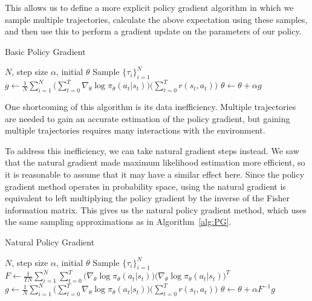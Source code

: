 \documentclass[twoside,10pt]{article}
\begin{document}
This allows us to define a more explicit policy gradient algorithm in which we sample multiple trajectories, calculate the above expectation using these samples, and then use this to perform a gradient update on the parameters of our policy.

{\centering
\begin{minipage}{0.7\linewidth}
\begin{algorithm}[H]
    \caption{Basic Policy Gradient}
    \label{alg:PG}
    \begin{algorithmic}
        \Require $N$, step size $\alpha$, initial $\theta$
            \State Sample $\{ \tau_i \}_{i=1}^N$
            \State $g \gets \frac{1}{N} \sum_{i=1}^N \big( \sum_{t=0}^T \nabla_\theta \log \pi_\theta(a_t \vert s_t) \big) \big( \sum_{t=0}^T r(s_t, a_t) \big)$
            \State $\theta \gets \theta + \alpha g$
        \EndWhile
    \end{algorithmic}
\end{algorithm}
\end{minipage}
\par}
\vspace{7mm}

One shortcoming of this algorithm is its data inefficiency. Multiple trajectories are needed to gain an accurate estimation of the policy gradient, but gaining multiple trajectories requires many interactions with the environment.

To address this inefficiency, we can take natural gradient steps instead.\cite{npg} We saw that the natural gradient made maximum likelihood estimation more efficient, so it is reasonable to assume that it may have a similar effect here. Since the policy gradient method operates in probability space, using the natural gradient is equivalent to left multiplying the policy gradient by the inverse of the Fisher information matrix. This gives us the natural policy gradient method, which uses the same sampling approximations as in Algorithm~\ref{alg:PG}.

{\centering
\begin{minipage}{0.7\linewidth}
\begin{algorithm}[H]
    \caption{Natural Policy Gradient}
    \label{alg:NPG}
    \begin{algorithmic}
        \Require $N$, step size $\alpha$, initial $\theta$
            \State Sample $\{ \tau_i \}_{i=1}^N$
            \State $F \gets \frac{1}{T N} \sum_{i=1}^N \sum_{t=0}^T \big( \nabla_\theta \log \pi_\theta(a_t \vert s_t) \big) \big( \nabla_\theta \log \pi_\theta(a_t \vert s_t) \big)^T$
            \State $g \gets \frac{1}{N} \sum_{i=1}^N \big( \sum_{t=0}^T \nabla_\theta \log \pi_\theta(a_t \vert s_t) \big) \big( \sum_{t=0}^T r(s_t, a_t) \big)$
            \State $\theta \gets \theta + \alpha F^{-1} g$
        \EndWhile
    \end{algorithmic}
\end{algorithm}
\end{minipage}
\par}
\vspace{7mm}
\end{document}
